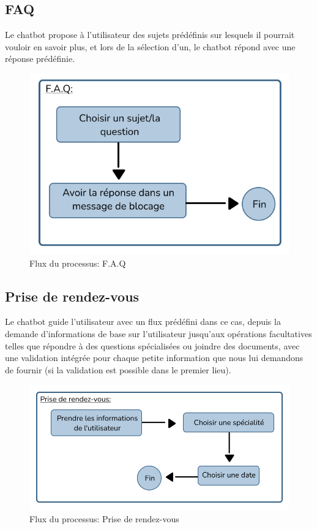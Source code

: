 \subsection{FAQ}

\hspace{16pt}Le chatbot propose à l'utilisateur des sujets prédéfinis sur lesquels il pourrait vouloir en savoir plus, et lors de la sélection d'un, le chatbot répond avec une réponse prédéfinie.

\begin{figure}[H] 
    \centering
    \includegraphics[scale=0.9]{Figures/cbf_faq.png}
    \caption{Flux du processus: F.A.Q}
\end{figure}

\subsection{Prise de rendez-vous}

\hspace{16pt}Le chatbot guide l'utilisateur avec un flux prédéfini dans ce cas, depuis la demande d'informations de base sur l'utilisateur jusqu'aux opérations facultatives telles que répondre à des questions spécialisées ou joindre des documents, avec une validation intégrée pour chaque petite information que nous lui demandons de fournir (si la validation est possible dans le premier lieu).


\begin{figure}[H] 
    \centering
    \includegraphics[scale=0.9]{Figures/cbf_rdv.png}
    \caption{Flux du processus: Prise de rendez-vous}
\end{figure}


